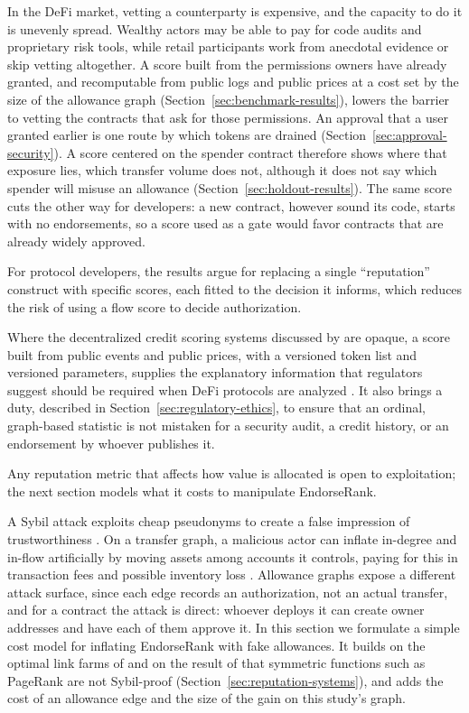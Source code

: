 In the DeFi market, vetting a counterparty is expensive, and the capacity to do it is unevenly spread. Wealthy actors may be able to pay for code audits and proprietary risk tools, while retail participants work from anecdotal evidence or skip vetting altogether. A score built from the permissions owners have already granted, and recomputable from public logs and public prices at a cost set by the size of the allowance graph (Section~\ref{sec:benchmark-results}), lowers the barrier to vetting the contracts that ask for those permissions. An approval that a user granted earlier is one route by which tokens are drained (Section~\ref{sec:approval-security}). A score centered on the spender contract therefore shows where that exposure lies, which transfer volume does not, although it does not say which spender will misuse an allowance (Section~\ref{sec:holdout-results}). The same score cuts the other way for developers: a new contract, however sound its code, starts with no endorsements, so a score used as a gate would favor contracts that are already widely approved.

For protocol developers, the results argue for replacing a single ``reputation'' construct with specific scores, each fitted to the decision it informs, which reduces the risk of using a flow score to decide authorization.

Where the decentralized credit scoring systems discussed by \textcite{packin2024credit} are opaque, a score built from public events and public prices, with a versioned token list and versioned parameters, supplies the explanatory information that regulators suggest should be required when DeFi protocols are analyzed \parencite{zetzsche2020defi}. It also brings a duty, described in Section~\ref{sec:regulatory-ethics}, to ensure that an ordinal, graph-based statistic is not mistaken for a security audit, a credit history, or an endorsement by whoever publishes it.

Any reputation metric that affects how value is allocated is open to exploitation; the next section models what it costs to manipulate EndorseRank.


A Sybil attack exploits cheap pseudonyms to create a false impression of trustworthiness \parencite{douceur2002sybil}. On a transfer graph, a malicious actor can inflate in-degree and in-flow artificially by moving assets among accounts it controls, paying for this in transaction fees and possible inventory loss \parencite{cong2023washtrading}. Allowance graphs expose a different attack surface, since each edge records an authorization, not an actual transfer, and for a contract the attack is direct: whoever deploys it can create owner addresses and have each of them approve it. In this section we formulate a simple cost model for inflating EndorseRank with fake allowances. It builds on the optimal link farms of \textcite{gyongyi2005alliances} and on the result of \textcite{cheng2005sybilproof} that symmetric functions such as PageRank are not Sybil-proof (Section~\ref{sec:reputation-systems}), and adds the cost of an allowance edge and the size of the gain on this study's graph.

